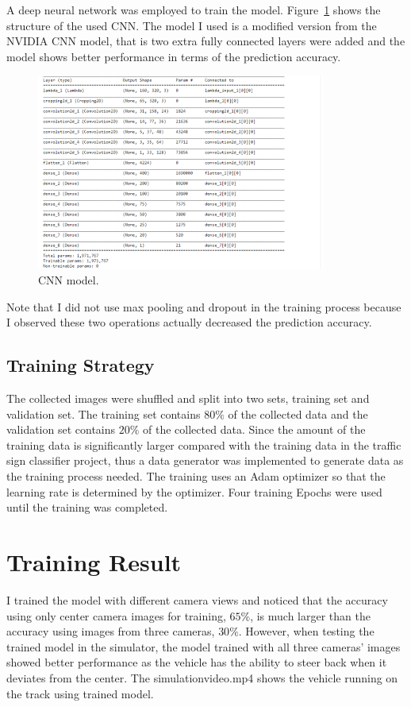 \documentclass{article}
\begin{document}
A deep neural network was employed to train the model. Figure~\ref{fig: cnn} shows the structure of the used CNN. The model I used is a modified version from the NVIDIA CNN model, that is two extra fully connected layers were added and the model shows better performance in terms of the prediction accuracy. 
\begin{figure}[H]
\centering
\includegraphics[width=0.85\textwidth]{cnn_model.png}
\caption{CNN model.}
\label{fig: cnn}
\end{figure}

Note that I did not use max pooling and dropout in the training process because I observed these two operations actually decreased the prediction accuracy.

\subsection{Training Strategy}
The collected images were shuffled and split into two sets, training set and validation set. The training set contains $80\%$ of the collected data and the validation set contains $20\%$ of the collected data. Since the amount of the training data is significantly larger compared with the training data in the traffic sign classifier project, thus a data generator was implemented to generate data as the training process needed. The training uses an Adam optimizer so that the learning rate is determined by the optimizer. Four training Epochs were used until the training was completed. 


\section{Training Result}
I trained the model with different camera views and noticed that the accuracy using only center camera images for training, $65\%$, is much larger than the accuracy using images from three cameras, $30\%$. However, when testing the trained model in the simulator, the model trained with all three cameras' images showed better performance as the vehicle has the ability to steer back when it deviates from the center. The simulationvideo.mp4 shows the vehicle running on the track using trained model.
\end{document}
